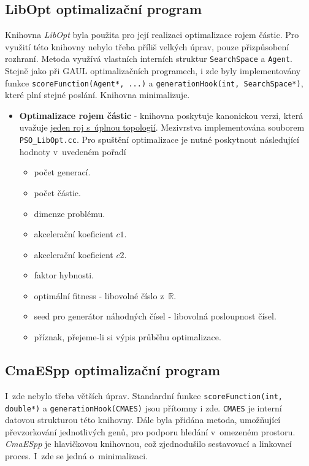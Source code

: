 \subsection*{LibOpt optimalizační program}
Knihovna \emph{LibOpt} byla použita pro její realizaci optimalizace rojem částic. Pro využití této knihovny nebylo třeba příliš velkých úprav, pouze přizpůsobení rozhraní. Metoda využívá vlastních interních struktur \texttt{SearchSpace} a \texttt{Agent}. Stejně jako při GAUL optimalizačních programech, i zde byly implementovány funkce \texttt{scoreFunction(Agent*, ...)} a \texttt{generationHook(int, SearchSpace*)}, které plní stejné poslání. Knihovna minimalizuje.

\begin{itemize}
    \item \textbf{Optimalizace rojem částic} - knihovna poskytuje kanonickou verzi, která uvažuje \underline{jeden roj s~úplnou topologií}. Mezivrstva implementována souborem \texttt{PSO\_LibOpt.cc}. Pro spuštění optimalizace je nutné poskytnout následující hodnoty v~uvedeném pořadí
\begin{itemize}
    \item počet generací.
    \item počet částic.
    \item dimenze problému.
    \item akcelerační koeficient $c1$.
    \item akcelerační koeficient $c2$.
    \item faktor hybnosti.
    \item optimální fitness - libovolné číslo z~$\mathbb{R}$.
    \item seed pro generátor náhodných čísel - libovolná posloupnost čísel.
    \item příznak, přejeme-li si výpis průběhu optimalizace.
\end{itemize}
\end{itemize}

\subsection*{CmaESpp optimalizační program}
I~zde nebylo třeba větších úprav. Standardní funkce \texttt{scoreFunction(int, double*)} a \texttt{generationHook(CMAES)} jsou přítomny i zde. \texttt{CMAES} je interní datovou strukturou této knihovny. Dále byla přidána metoda, umožňující převzorkování jednotlivých genů, pro podporu hledání v~omezeném prostoru.
\emph{CmaESpp} je hlavičkovou knihovnou, což zjednodušilo sestavovací a linkovací proces. I~zde se jedná o~minimalizaci.

